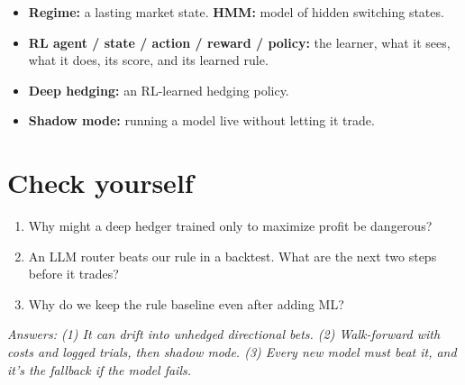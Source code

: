 \documentclass{article}
\begin{document}
\begin{itemize}

\item \textbf{Regime:} a lasting market state. \textbf{HMM:} model of hidden switching states.

\item \textbf{RL agent /\allowbreak{} state /\allowbreak{} action /\allowbreak{} reward /\allowbreak{} policy:} the learner, what it sees, what it does, its score, and its learned rule.

\item \textbf{Deep hedging:} an RL-learned hedging policy.

\item \textbf{Shadow mode:} running a model live without letting it trade.

\end{itemize}

\section{Check yourself}

\begin{enumerate}

\item Why might a deep hedger trained only to maximize profit be dangerous?

\item An LLM router beats our rule in a backtest. What are the next two steps before it trades?

\item Why do we keep the rule baseline even after adding ML?

\end{enumerate}

\emph{Answers: (1) It can drift into unhedged directional bets. (2) Walk-forward with costs and logged trials, then shadow mode. (3) Every new model must beat it, and it's the fallback if the model fails.}
\end{document}
